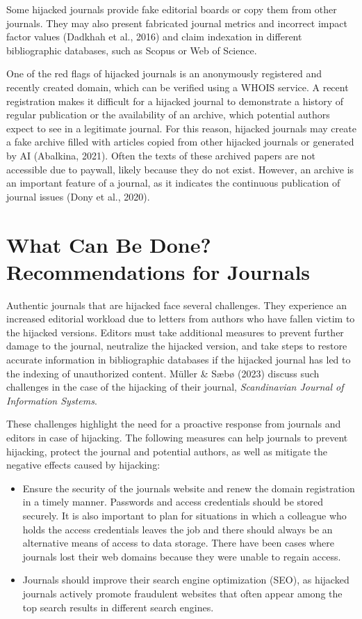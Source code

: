 \documentclass[a4paper,
fontsize=11pt,
oneside,
numbers=noperiodatend,
parskip=half-,
bibliography=totoc,
final
]{scrartcl}
\begin{document}
Some hijacked journals provide fake editorial boards or copy them from
other journals. They may also present fabricated journal metrics and
incorrect impact factor values (Dadkhah et al., 2016) and claim
indexation in different bibliographic databases, such as Scopus or Web
of Science.

One of the red flags of hijacked journals is an anonymously registered
and recently created domain, which can be verified using a WHOIS
service. A recent registration makes it difficult for a hijacked journal
to demonstrate a history of regular publication or the availability of
an archive, which potential authors expect to see in a legitimate
journal. For this reason, hijacked journals may create a fake archive
filled with articles copied from other hijacked journals or generated by
AI (Abalkina, 2021). Often the texts of these archived papers are not
accessible due to paywall, likely because they do not exist. However, an
archive is an important feature of a journal, as it indicates the
continuous publication of journal issues (Dony et al., 2020).

\section{What Can Be Done? Recommendations for
Journals}\label{what-can-be-done-recommendations-for-journals}

Authentic journals that are hijacked face several challenges. They
experience an increased editorial workload due to letters from authors
who have fallen victim to the hijacked versions. Editors must take
additional measures to prevent further damage to the journal, neutralize
the hijacked version, and take steps to restore accurate information in
bibliographic databases if the hijacked journal has led to the indexing
of unauthorized content. Müller \& Sæbø (2023) discuss such challenges
in the case of the hijacking of their journal, \emph{Scandinavian
Journal of Information Systems}.

These challenges highlight the need for a proactive response from
journals and editors in case of hijacking. The following measures can
help journals to prevent hijacking, protect the journal and potential
authors, as well as mitigate the negative effects caused by hijacking:

\begin{itemize}
\item
  Ensure the security of the journal\textquotesingle s website and renew
  the domain registration in a timely manner. Passwords and access
  credentials should be stored securely. It is also important to plan
  for situations in which a colleague who holds the access credentials
  leaves the job and there should always be an alternative means of
  access to data storage. There have been cases where journals lost
  their web domains because they were unable to regain access.
\item
  Journals should improve their search engine optimization (SEO), as
  hijacked journals actively promote fraudulent websites that often
  appear among the top search results in different search engines.
\end{itemize}
\end{document}
